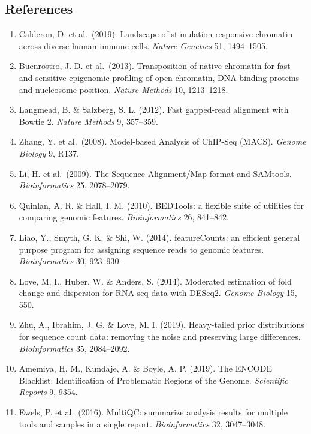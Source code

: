 \documentclass[
  11pt,
  a4paper,
]{article}
\providecommand{\tightlist}{%
  \setlength{\itemsep}{0pt}\setlength{\parskip}{0pt}}
\begin{document}
\hypertarget{references}{%
\subsection{References}\label{references}}

\begin{enumerate}
\def\labelenumi{\arabic{enumi}.}
\tightlist
\item
  Calderon, D. et al.~(2019). Landscape of stimulation-responsive
  chromatin across diverse human immune cells. \emph{Nature Genetics}
  51, 1494--1505.
\item
  Buenrostro, J. D. et al.~(2013). Transposition of native chromatin for
  fast and sensitive epigenomic profiling of open chromatin, DNA-binding
  proteins and nucleosome position. \emph{Nature Methods} 10,
  1213--1218.
\item
  Langmead, B. \& Salzberg, S. L. (2012). Fast gapped-read alignment
  with Bowtie 2. \emph{Nature Methods} 9, 357--359.
\item
  Zhang, Y. et al.~(2008). Model-based Analysis of ChIP-Seq (MACS).
  \emph{Genome Biology} 9, R137.
\item
  Li, H. et al.~(2009). The Sequence Alignment/Map format and SAMtools.
  \emph{Bioinformatics} 25, 2078--2079.
\item
  Quinlan, A. R. \& Hall, I. M. (2010). BEDTools: a flexible suite of
  utilities for comparing genomic features. \emph{Bioinformatics} 26,
  841--842.
\item
  Liao, Y., Smyth, G. K. \& Shi, W. (2014). featureCounts: an efficient
  general purpose program for assigning sequence reads to genomic
  features. \emph{Bioinformatics} 30, 923--930.
\item
  Love, M. I., Huber, W. \& Anders, S. (2014). Moderated estimation of
  fold change and dispersion for RNA-seq data with DESeq2. \emph{Genome
  Biology} 15, 550.
\item
  Zhu, A., Ibrahim, J. G. \& Love, M. I. (2019). Heavy-tailed prior
  distributions for sequence count data: removing the noise and
  preserving large differences. \emph{Bioinformatics} 35, 2084--2092.
\item
  Amemiya, H. M., Kundaje, A. \& Boyle, A. P. (2019). The ENCODE
  Blacklist: Identification of Problematic Regions of the Genome.
  \emph{Scientific Reports} 9, 9354.
\item
  Ewels, P. et al.~(2016). MultiQC: summarize analysis results for
  multiple tools and samples in a single report. \emph{Bioinformatics}
  32, 3047--3048.

\end{enumerate}
\end{document}
